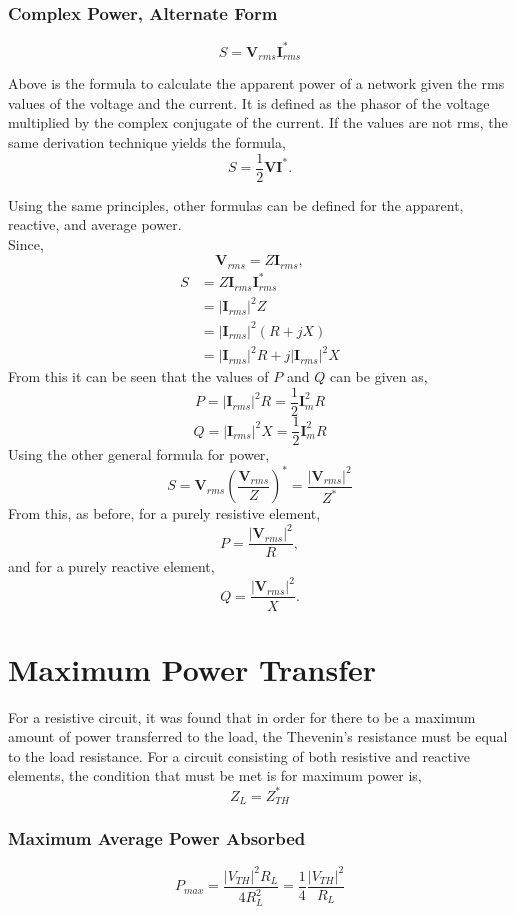 \documentclass[12pt]{article}
\begin{document}
    \subsubsection*{Complex Power, Alternate Form}
    \[
        S = \textbf{V}_{rms} \textbf{I}_{rms}^{*}
    \]
    \par Above is the formula to calculate the apparent power of a network given
    the rms values of the voltage and the current. It is defined as the phasor
    of the voltage multiplied by the complex conjugate of the current. If the
    values are not rms, the same derivation technique yields the formula,
    \[
        S = \frac{1}{2} \textbf{V} \textbf{I}^{*}
    .\]
    \par Using the same principles, other formulas can be defined for the
    apparent, reactive, and average power.
    \\ Since,
    \[
        \textbf{V}_{rms} = Z \textbf{I}_{rms}
    ,\]
    \begin{align*}
        S &= Z \textbf{I}_{rms} \textbf{I}_{rms}^{*} \\
          &= |\textbf{I}_{rms}|^2 Z \\
          &= |\textbf{I}_{rms}|^2 (R + jX) \\
          &= |\textbf{I}_{rms}|^2 R + j |\textbf{I}_{rms}|^2 X
    \end{align*}
    From this it can be seen that the values of $P$ and $Q$ can be given as,
    \[
        P = |\textbf{I}_{rms}|^{2} R = \frac{1}{2} \textbf{I}_{m}^2 R
    \]
    \[
        Q = |\textbf{I}_{rms}|^{2} X = \frac{1}{2} \textbf{I}_{m}^2 R
    \]
    Using the other general formula for power,
    \[
        S = \textbf{V}_{rms} \left( \frac{\textbf{V}_{rms}}{Z} \right)^{*} =
        \frac{|\textbf{V}_{rms}|^2}{Z^{*}}
    \]
    From this, as before, for a purely resistive element,
    \[
        P = \frac{|\textbf{V}_{rms}|^2}{R}
    ,\]
    and for a purely reactive element,
    \[
        Q = \frac{|\textbf{V}_{rms}|^2}{X}
    .\]
    \section*{Maximum Power Transfer}
    For a resistive circuit, it was found that in order for there to be a
    maximum amount of power transferred to the load, the Thevenin's resistance
    must be equal to the load resistance. For a circuit consisting of both
    resistive and reactive elements, the condition that must be met is for
    maximum power is,
    \[
        Z_{L} = Z_{TH}^{*}
    \]
    \subsubsection*{Maximum Average Power Absorbed}
    \[
        P_{max} = \frac{|V_{TH}|^2 R_{L}}{4 R_{L}^2} = \frac{1}{4}
        \frac{|V_{TH}|^2}{R_{L}}
    \]
\end{document}

